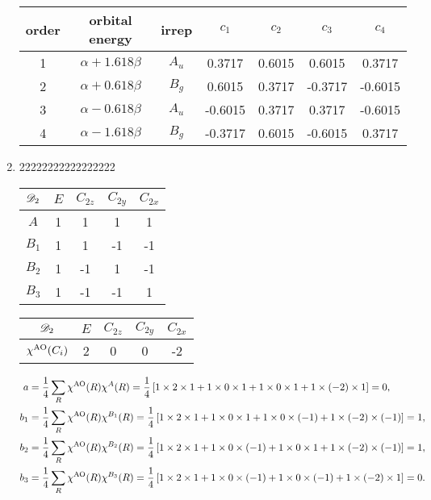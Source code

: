 \documentclass[a4paper]{book}
\newcommand{\AO}{{\rm AO}}
\begin{document}
\begin{solution}
\begin{enumerate}[label=(\alph*)]
		\begin{center}
		\begin{tabular}{ccccccc}\hline
		order 	& orbital energy & irrep & $c_1$ & $c_2$ & $c_3$ &$c_4$ \\ \hline
			1	&	$\alpha+1.618\beta$	&	$A_u$	&	0.3717	&	0.6015	&	0.6015	&	0.3717	\\
			2	&	$\alpha+0.618\beta$	&	$B_g$	&	0.6015	&	0.3717	&	-0.3717	&	-0.6015	\\
			3	&	$\alpha-0.618\beta$	&	$A_u$	&	-0.6015	&	0.3717	&	0.3717	&	-0.6015	\\
			4	&	$\alpha-1.618\beta$	&	$B_g$	&	-0.3717	&	0.6015	&	-0.6015	&	0.3717	\\ \hline
		\end{tabular}
		\end{center}
		
		
		
		
		\item 22222222222222222
		
		
		\begin{center}
		\begin{tabular}{ccccc}\hline
	$\mathscr{D}_{\rm 2}$ & $E$ & $C_{2z}$ & $C_{2y}$ & $C_{2x}$ \\ \hline
			$A$		&	1	&	1	&	1	&	1	\\
			$B_1$	&	1	&	1	&	-1	&	-1	\\
			$B_2$	&	1	&	-1	&	1	&	-1	\\
			$B_3$ 	&	1	&	-1	&	-1	&	1	\\ \hline
		\end{tabular}
		\end{center}
		
		
		\begin{center}
		\begin{tabular}{ccccc}\hline
	$\mathscr{D}_{\rm 2}$ & $E$ & $C_{2z}$ & $C_{2y}$ & $C_{2x}$  \\ \hline
	$\chi^{\AO}(C_i)$	&	2	&	0	&	0	&	-2	\\ \hline
		\end{tabular}
		\end{center}
		
		\begin{align*}
		a &= \frac{1}{4} \sum_{R} \chi^{\AO}(R) \chi^{A}(R) = \frac{1}{4} \left[ 1 \times 2 \times 1 + 1 \times 0 \times 1 + 1 \times 0 \times 1 + 1 \times (-2) \times 1 \right] = 0, \\
		b_1	&= \frac{1}{4} \sum_{R} \chi^{\AO}(R) \chi^{B_1}(R) = \frac{1}{4} \left[ 1 \times 2 \times 1 + 1 \times 0 \times 1 + 1 \times 0 \times (-1) + 1 \times (-2) \times (-1) \right] = 1, \\
		b_2	&= \frac{1}{4} \sum_{R} \chi^{\AO}(R) \chi^{B_2}(R) = \frac{1}{4} \left[ 1 \times 2 \times 1 + 1 \times 0 \times (-1) + 1 \times 0 \times 1 + 1 \times (-2) \times (-1) \right] = 1, \\
		b_3	&= \frac{1}{4} \sum_{R} \chi^{\AO}(R) \chi^{B_3}(R) = \frac{1}{4} \left[ 1 \times 2 \times 1 + 1 \times 0 \times (-1) + 1 \times 0 \times (-1) + 1 \times (-2) \times 1 \right] = 0.
		\end{align*}
		

\end{enumerate}
\end{solution}
\end{document}
